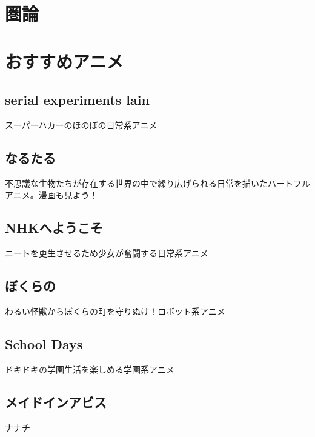 \documentclass{jarticle}
\begin{document}
\section{圏論}
\clearpage
\section{おすすめアニメ}
   \subsection{serial experiments lain}
      スーパーハカーのほのぼの日常系アニメ
   \subsection{なるたる}
      不思議な生物たちが存在する世界の中で繰り広げられる日常を描いたハートフルアニメ。漫画も見よう！
   \subsection{NHKへようこそ}
      ニートを更生させるため少女が奮闘する日常系アニメ
   \subsection{ぼくらの}
      わるい怪獣からぼくらの町を守りぬけ！ロボット系アニメ
   \subsection{School Days}
      ドキドキの学園生活を楽しめる学園系アニメ
   \subsection{メイドインアビス}
      ナナチ
\end{document}

